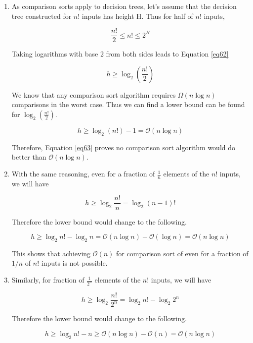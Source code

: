 \begin{enumerate}[label=(\alph*)]
\item As comparison sorts apply to decision trees, let's assume that the decision tree constructed for $n!$ inputs has height H. Thus for half of $n!$ inputs,

\begin{equation}\label{eq61}
\frac{n!}{2} \leq n! \leq 2^H
\end{equation}

Taking logarithms with base 2 from both sides leads to Equation \ref{eq62}

\begin{equation}\label{eq62}
h \geq \log_2 (\frac{n!}{2})
\end{equation}

We know that any comparison sort algorithm requires $\Omega(n \log n)$ comparisons in the worst case. Thus we can find a lower bound can be found for $\log_2(\frac{n!}{2})$.

\begin{equation}\label{eq63}
h \geq \log_2 (n!) - 1 = \mathcal{O}(n \log n) 
\end{equation}

Therefore, Equation \ref{eq63} proves no comparison sort algorithm would do better than $\mathcal{O}(n\log n)$.

\item With the same reasoning, even for a fraction of $\frac{1}{n}$ elements of the $n!$ inputs, we will have

\begin{equation}\label{eq64}
h \geq \log_2 \frac{n!}{n} = \log_2 {(n-1)!}
\end{equation}

Therefore the lower bound would change to the following.

\begin{equation}\label{eq65}
h \geq \log_2 n! - \log_2 n = \mathcal{O}(n \log n) - \mathcal{O}(\log n) = \mathcal{O}(n \log n)
\end{equation}

This shows that achieving $\mathcal{O}(n)$ for comparison sort of  even for a fraction of $1/n$ of $n!$ inputs is not possible.

\item Similarly, for fraction of $\frac{1}{2^{n}}$ elements of the $n!$ inputs, we will have

\begin{equation}\label{eq66}
h \geq \log_2 \frac{n!}{2^{n}} = \log_2 {n!} - \log_2 {2^{n}}
\end{equation}

Therefore the lower bound would change to the following.

\begin{equation}\label{eq67}
h \geq \log_2 {n!} - n \geq \mathcal{O}(n \log n) - \mathcal{O}(n) = \mathcal{O}(n \log n)
\end{equation}

\end{enumerate}



